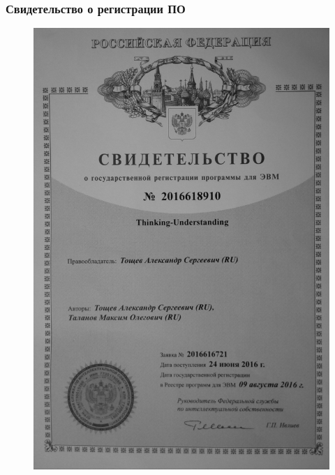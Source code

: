 \documentclass[14pt]{beamer}
\begin{document}
\begin{frame}
\frametitle{Свидетельство о регистрации ПО}
\begin{figure} [h] 
  \center
  \includegraphics [scale=0.05] {RegistrationStatement}
  \label{img:RegistrationStatement}  
\end{figure}

\end{frame}
\end{document}
